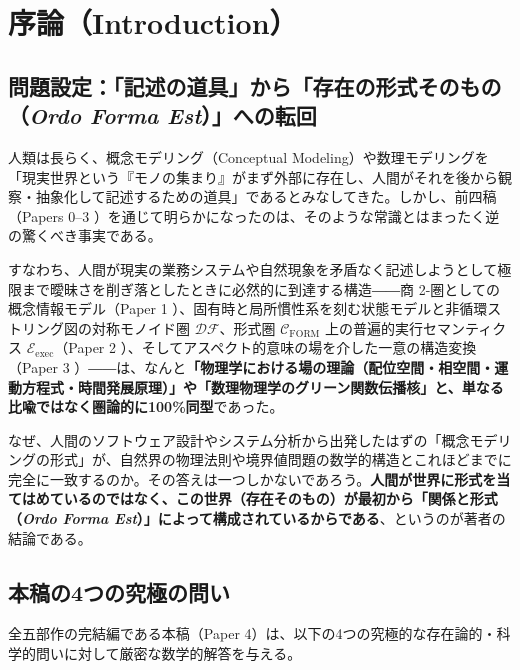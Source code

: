 \documentclass[11pt,a4paper]{ltjsarticle}
\theoremstyle{definition}
\theoremstyle{plain}
\begin{document}
\section{序論（Introduction）}

\subsection{問題設定：「記述の道具」から「存在の形式そのもの（\textit{Ordo Forma Est}）」への転回}
人類は長らく、概念モデリング（Conceptual Modeling）や数理モデリングを「現実世界という『モノの集まり』がまず外部に存在し、人間がそれを後から観察・抽象化して記述するための道具」であるとみなしてきた。しかし、前四稿（Papers 0--3 \cite{Ota2026_0,Ota2026_1,Ota2026_2,Ota2026_3}）を通じて明らかになったのは、そのような常識とはまったく逆の驚くべき事実である。

すなわち、人間が現実の業務システムや自然現象を矛盾なく記述しようとして極限まで曖昧さを削ぎ落としたときに必然的に到達する構造――商 2-圏としての概念情報モデル（Paper 1 \cite{Ota2026_1}）、固有時と局所慣性系を刻む状態モデルと非循環ストリング図の対称モノイド圏 $\mathcal{DF}$、形式圏 $\mathcal{C}_{\mathrm{FORM}}$ 上の普遍的実行セマンティクス $\mathcal{E}_{\mathrm{exec}}$（Paper 2 \cite{Ota2026_2}）、そしてアスペクト的意味の場を介した一意の構造変換（Paper 3 \cite{Ota2026_3}）――は、なんと\textbf{「物理学における場の理論（配位空間・相空間・運動方程式・時間発展原理）」や「数理物理学のグリーン関数伝播核」と、単なる比喩ではなく圏論的に100\%同型}であった。

なぜ、人間のソフトウェア設計やシステム分析から出発したはずの「概念モデリングの形式」が、自然界の物理法則や境界値問題の数学的構造とこれほどまでに完全に一致するのか。その答えは一つしかないであろう。\textbf{人間が世界に形式を当てはめているのではなく、この世界（存在そのもの）が最初から「関係と形式（\textit{Ordo Forma Est}）」によって構成されているからである}、というのが著者の結論である。

\subsection{本稿の4つの究極の問い}
全五部作の完結編である本稿（Paper 4）は、以下の4つの究極的な存在論的・科学的問いに対して厳密な数学的解答を与える。
\end{document}
